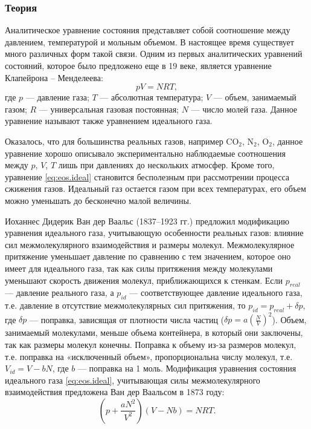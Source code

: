 

\subsubsection{Теория}
Аналитическое уравнение состояния представляет собой соотношение между давлением, температурой и мольным объемом. В настоящее время существует много различных форм такой связи. Одним из первых аналитических уравнений состояний, которое было предложено еще в 19 веке, является уравнение Клапейрона – Менделеева:
\begin{equation}\label{eq:eos.ideal}
	p V= N R T,
\end{equation}
где $p$ --- давление газа; $T$ --- абсолютная температура; $V$ --- объем, занимаемый газом; $R$ --- универсальная газовая постоянная; $N$ --- число молей газа. Данное уравнение называют также уравнением идеального газа. 

Оказалось, что для большинства реальных газов, например $\mathrm{CO_2}$, $\mathrm{N_2}$, $\mathrm{O_2}$, данное уравнение хорошо описывало экспериментально наблюдаемые соотношения между $p$, $V$, $T$ лишь при давлениях до нескольких атмосфер. Кроме того, уравнение \eqref{eq:eos.ideal} становится бесполезным при рассмотрении процесса сжижения газов. Идеальный газ остается газом при всех температурах, его объем можно уменьшать до бесконечно малой величины.
 
Иоханнес Дидерик Ван дер Ваальс (1837–1923 гг.) предложил модификацию уравнения идеального газа, учитывающую особенности реальных газов: влияние сил межмолекулярного взаимодействия и размеры молекул. Межмолекулярное притяжение уменьшает давление по сравнению с тем значением, которое оно имеет для идеального газа, так как силы притяжения между молекулами уменьшают скорость движения молекул, приближающихся к стенкам. Если $p_{real}$ --- давление реального газа, а $p_{id}$ --- соответствующее давление идеального газа, т.е. давление в отсутствие межмолекулярных сил притяжения, то $p_{id}=p_{real}+\delta p$, где $\delta p$ --- поправка, зависящая от плотности числа частиц ($\delta p = a \left(\frac{N}{V} \right)^2$). Объем, занимаемый молекулами, меньше объема контейнера, в который они заключены, так как размеры молекул конечны. Поправка к объему из-за размеров молекул, т.е.  поправка на «исключенный объем», пропорциональна числу молекул, т.е. $V_{id}=V-b N$, где $b$ --- поправка на 1 моль. Модификация уравнения состояния идеального газа \eqref{eq:eos.ideal}, учитывающая силы межмолекулярного взаимодействия предложена Ван дер Ваальсом в 1873 году:
\begin{equation} \label{eq:eos.vdv}
	\left( p+ \dfrac{a N^2}{V^2} \right) (V- Nb) = N R T.
\end{equation}



